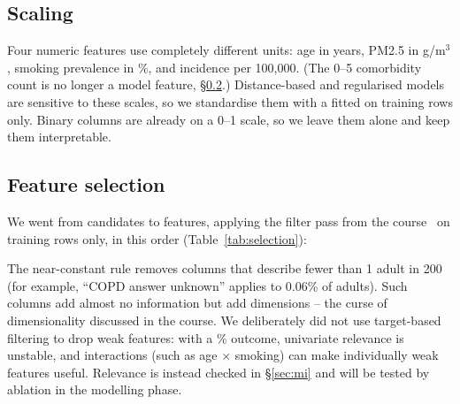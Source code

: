 \subsection{Scaling}\label{sec:scaling}

Four numeric features use completely different units: age in years, PM2.5 in \textmu g/m$^3$, smoking prevalence in \%, and incidence per 100,000. (The 0--5 comorbidity count is no longer a model feature, \S\ref{sec:selection}.) Distance-based and regularised models are sensitive to these scales, so we standardise them with a  fitted on training rows only. Binary columns are already on a 0--1 scale, so we leave them alone and keep them interpretable.

\begin{table}[htbp]
\centering\small
\caption{Scaler parameters learned on the \nTrain training rows, and the mean of each scaled column on the test rows.}\label{tab:scaler}

\end{table}

\subsection{Feature selection}\label{sec:selection}

We went from \nCandidates candidates to \nFeatures features, applying the filter pass from the course~\cite{larose,louati} on training rows only, in this order (Table~\ref{tab:selection}):

\begin{table}[htbp]
\centering\small
\caption{Feature-selection rules and the features each rule removed (\nDropped in total). Never candidates: \texttt{person\_id} (identifier), \texttt{split} (train/test label), \texttt{survey\_weight} (a sampling weight, not a property of the person) and \texttt{CANEV\_A} (reveals the answer). \texttt{sex\_Male} and \texttt{region\_West}, dropped by rule 3, also serve as the reference categories of sex and region.}\label{tab:selection}

\end{table}

The near-constant rule removes columns that describe fewer than 1 adult in 200 (for example, ``COPD answer unknown'' applies to 0.06\% of adults). Such columns add almost no information but add dimensions -- the curse of dimensionality discussed in the course. We deliberately did not use target-based filtering to drop weak features: with a \sampleRate\% outcome, univariate relevance is unstable, and interactions (such as age $\times$ smoking) can make individually weak features useful. Relevance is instead checked in \S\ref{sec:mi} and will be tested by ablation in the modelling phase.

